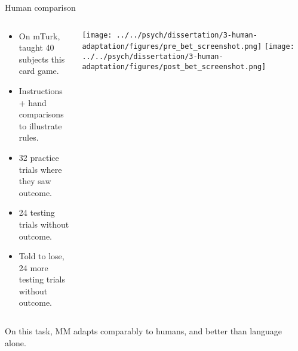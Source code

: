 \documentclass{beamer}
\begin{document}
\begin{frame}{Human comparison}
\begin{columns}
\begin{column}{0.5\textwidth}
\begin{itemize}
\item On mTurk, taught 40 subjects this card game.
\item Instructions + hand comparisons to illustrate rules.
\item 32 practice trials where they saw outcome.
\item 24 testing trials without outcome.
\item Told to lose, 24 more testing trials without outcome.
\end{itemize}
\end{column}

\begin{column}{0.5\textwidth}
\vspace{1em}
\texttt{[image: ../../psych/dissertation/3-human-adaptation/figures/pre\_bet\_screenshot.png]}
\texttt{[image: ../../psych/dissertation/3-human-adaptation/figures/post\_bet\_screenshot.png]}
\end{column}
\end{columns}

\end{frame}



\begin{frame}[standout]
On this task, MM adapts comparably to humans, and better than language alone. \\[1em]
\end{frame}
\end{document}

